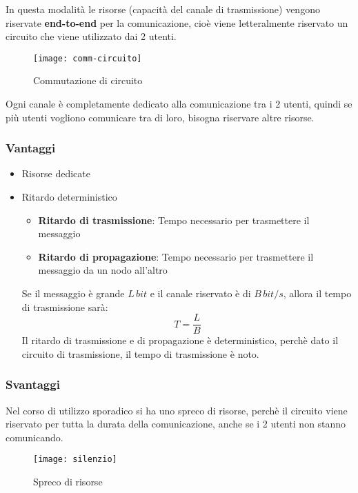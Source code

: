 \documentclass[a4paper]{article}
\begin{document}
\noindent
In questa modalità le risorse (capacità del canale di trasmissione) vengono riservate \textbf{end-to-end}
per la comunicazione, cioè viene letteralmente riservato un circuito che viene
utilizzato dai 2 utenti.
\begin{figure}[H]
  \centering
  \texttt{[image: comm-circuito]}
  \caption{Commutazione di circuito}
\end{figure}

\noindent
Ogni canale è completamente dedicato alla comunicazione tra i 2 utenti, quindi
se più utenti vogliono comunicare tra di loro, bisogna riservare altre risorse.

\subsubsection{Vantaggi}
\begin{itemize}
  \item Risorse dedicate
  \item Ritardo deterministico

    \noindent
    \begin{itemize}
      \begin{figure}[H]
        \centering
        \texttt{[image: ritardo]}
        \caption{Ritardo}
      \end{figure}
      \item \textbf{Ritardo di trasmissione}: Tempo necessario per trasmettere il messaggio
      \item \textbf{Ritardo di propagazione}: Tempo necessario per trasmettere il messaggio
        da un nodo all'altro
    \end{itemize}
    Se il messaggio è grande \( L\,bit \) e il canale riservato è di \( B\,bit/s \),
    allora il tempo di trasmissione sarà:
    \[
    T = \frac{L}{B}
    \] 
    Il ritardo di trasmissione e di propagazione è deterministico, perchè
    dato il circuito di trasmissione, il tempo di trasmissione è noto.
\end{itemize}

\subsubsection{Svantaggi}
Nel corso di utilizzo sporadico si ha uno spreco di risorse, perchè il circuito
viene riservato per tutta la durata della comunicazione, anche se i 2 utenti
non stanno comunicando.
\begin{figure}[H]
  \centering
  \texttt{[image: silenzio]}
  \caption{Spreco di risorse}
\end{figure}
\end{document}

